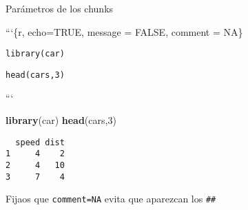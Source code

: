 \documentclass[ignorenonframetext,]{beamer}
\newenvironment{Shaded}{\begin{snugshade}}{\end{snugshade}}
\newcommand{\DecValTok}[1]{\textcolor[rgb]{0.00,0.00,0.81}{#1}}
\newcommand{\KeywordTok}[1]{\textcolor[rgb]{0.13,0.29,0.53}{\textbf{#1}}}
\newcommand{\NormalTok}[1]{#1}
\begin{document}
\begin{frame}[fragile]{Parámetros de los chunks}
\protect\hypertarget{parametros-de-los-chunks-4}{}

```\{r, echo=TRUE, message = FALSE, comment = NA\}

\texttt{library(car)}

\texttt{head(cars,3)}

```

\n

\begin{Shaded}
\begin{Highlighting}[]
\KeywordTok{library}\NormalTok{(car)}
\KeywordTok{head}\NormalTok{(cars,}\DecValTok{3}\NormalTok{)}
\end{Highlighting}
\end{Shaded}

\begin{verbatim}
  speed dist
1     4    2
2     4   10
3     7    4
\end{verbatim}

Fijaos que \texttt{comment=NA} evita que aparezcan los \texttt{\#\#}

\end{frame}
\end{document}
